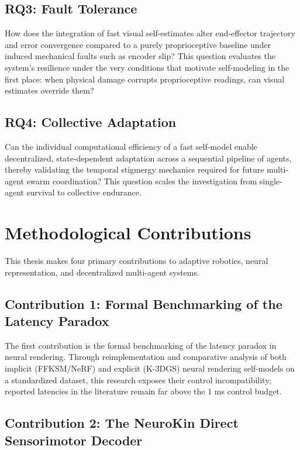 \documentclass[12pt,a4paper,oneside]{report}
\begin{document}
\subsection{RQ3: Fault Tolerance}
\label{subsec:RQ3}

How does the integration of fast visual self-estimates alter end-effector trajectory and error convergence compared to a purely proprioceptive baseline under induced mechanical faults such as encoder slip? This question evaluates the system's resilience under the very conditions that motivate self-modeling in the first place: when physical damage corrupts proprioceptive readings, can visual estimates override them?

\subsection{RQ4: Collective Adaptation}
\label{subsec:RQ4}

Can the individual computational efficiency of a fast self-model enable decentralized, state-dependent adaptation across a sequential pipeline of agents, thereby validating the temporal stigmergy mechanics required for future multi-agent swarm coordination? This question scales the investigation from single-agent survival to collective endurance.

\section{Methodological Contributions}
\label{sec:methodological_contributions}

This thesis makes four primary contributions to adaptive robotics, neural representation, and decentralized multi-agent systems.

\subsection{Contribution 1: Formal Benchmarking of the Latency Paradox}
\label{subsec:contrib_benchmarking}

The first contribution is the formal benchmarking of the latency paradox in neural rendering. Through reimplementation and comparative analysis of both implicit (FFKSM/NeRF) and explicit (K-3DGS) neural rendering self-models on a standardized dataset, this research exposes their control incompatibility; reported latencies in the literature remain far above the 1 ms control budget.

\subsection{Contribution 2: The NeuroKin Direct Sensorimotor Decoder}
\label{subsec:contrib_neurokin}
\end{document}
